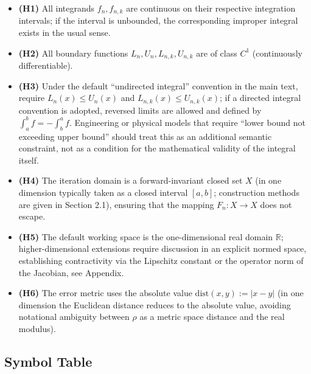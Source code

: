 \documentclass[11pt,a4paper]{amsart}
\begin{document}
\begin{itemize}
\item \textbf{(H1)} All integrands $f_n, f_{n,k}$ are continuous on their respective integration intervals; if the interval is unbounded, the corresponding improper integral exists in the usual sense.
\item \textbf{(H2)} All boundary functions $L_n, U_n, L_{n,k}, U_{n,k}$ are of class $C^1$ (continuously differentiable).
\item \textbf{(H3)} Under the default ``undirected integral'' convention in the main text, require $L_n(x) \le U_n(x)$ and $L_{n,k}(x) \le U_{n,k}(x)$; if a directed integral convention is adopted, reversed limits are allowed and defined by $\int_a^b f = -\int_b^a f$. Engineering or physical models that require ``lower bound not exceeding upper bound'' should treat this as an additional semantic constraint, not as a condition for the mathematical validity of the integral itself.
\item \textbf{(H4)} The iteration domain is a forward-invariant closed set $X$ (in one dimension typically taken as a closed interval $[a,b]$; construction methods are given in Section 2.1), ensuring that the mapping $F_n: X \to X$ does not escape.
\item \textbf{(H5)} The default working space is the one-dimensional real domain $\mathbb{R}$; higher-dimensional extensions require discussion in an explicit normed space, establishing contractivity via the Lipschitz constant or the operator norm of the Jacobian, see Appendix.
\item \textbf{(H6)} The error metric uses the absolute value $\mathrm{dist}(x,y) := \lvert x - y\rvert$ (in one dimension the Euclidean distance reduces to the absolute value, avoiding notational ambiguity between $\rho$ as a metric space distance and the real modulus).
\end{itemize}

\subsection*{Symbol Table}
\end{document}
